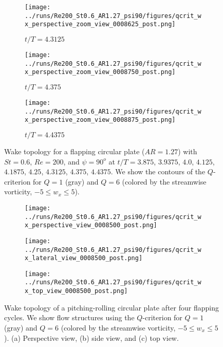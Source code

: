 \begin{figure}
\begin{subfigure}[b]{0.3\textwidth}
    \centering
    \texttt{[image: ../runs/Re200\_St0.6\_AR1.27\_psi90/figures/qcrit\_wx\_perspective\_zoom\_view\_0008625\_post.png]}
    \caption{$t / T = 4.3125$}
  \end{subfigure}
  \hfill
  \begin{subfigure}[b]{0.3\textwidth}
    \centering
    \texttt{[image: ../runs/Re200\_St0.6\_AR1.27\_psi90/figures/qcrit\_wx\_perspective\_zoom\_view\_0008750\_post.png]}
    \caption{$t / T = 4.375$}
  \end{subfigure}
  \hfill
  \begin{subfigure}[b]{0.3\textwidth}
    \centering
    \texttt{[image: ../runs/Re200\_St0.6\_AR1.27\_psi90/figures/qcrit\_wx\_perspective\_zoom\_view\_0008875\_post.png]}
    \caption{$t / T = 4.4375$}
  \end{subfigure}
  \caption{Wake topology for a flapping circular plate ($AR = 1.27$) with $St = 0.6$, $Re = 200$, and $\psi = 90^o$ at $t / T = 3.875$, $3.9375$, $4.0$, $4.125$, $4.1875$, $4.25$, $4.3125$, $4.375$, $4.4375$. We show the contours of the $Q$-criterion for $Q = 1$ (gray) and $Q = 6$ (colored by the streamwise vorticity, $-5 \leq w_x \leq 5$).}
  \label{fig:baseline_qcrit_perspective}
\end{figure}

\begin{figure}
  \centering
  \begin{minipage}{0.55\linewidth}
    \begin{subfigure}[t]{\linewidth}
      \texttt{[image: ../runs/Re200\_St0.6\_AR1.27\_psi90/figures/qcrit\_wx\_perspective\_view\_0008500\_post.png]}
      \caption{}
    \end{subfigure}
  \end{minipage}
  \begin{minipage}{0.35\linewidth}
    \begin{subfigure}[t]{\linewidth}
      \texttt{[image: ../runs/Re200\_St0.6\_AR1.27\_psi90/figures/qcrit\_wx\_lateral\_view\_0008500\_post.png]}
      \caption{}
    \end{subfigure}
    \vspace{1cm}
    \begin{subfigure}[b]{\linewidth}
      \texttt{[image: ../runs/Re200\_St0.6\_AR1.27\_psi90/figures/qcrit\_wx\_top\_view\_0008500\_post.png]}
      \caption{}
    \end{subfigure}
  \end{minipage}
  \caption{Wake topology of a pitching-rolling circular plate after four flapping cycles. We show flow structures  using the $Q$-criterion for $Q = 1$ (gray) and $Q = 6$ (colored by the streamwise vorticity, $-5 \leq w_x \leq 5$). (a) Perspective view, (b) side view, and (c) top view.}
  \label{fig:baseline_wake_topology}
\end{figure}

